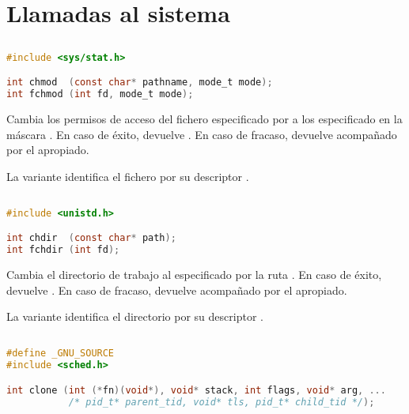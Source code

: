 \chapter{Llamadas al sistema}

\section{}\label{chmod}

\begin{lstlisting}[language=C]
#include <sys/stat.h>

int chmod  (const char* pathname, mode_t mode);
int fchmod (int fd, mode_t mode);
\end{lstlisting}

Cambia los permisos de acceso del fichero especificado por  a los especificado en la máscara .
En caso de éxito, devuelve .
En caso de fracaso, devuelve  acompañado por el  apropiado.

La variante  identifica el fichero por su descriptor .

\section{}\label{chdir}

\begin{lstlisting}[language=C]
#include <unistd.h>

int chdir  (const char* path);
int fchdir (int fd);
\end{lstlisting}

Cambia el directorio de trabajo al especificado por la ruta .
En caso de éxito, devuelve .
En caso de fracaso, devuelve  acompañado por el  apropiado.

La variante  identifica el directorio por su descriptor .

\section{}\label{clone}

\begin{lstlisting}[language=C]
#define _GNU_SOURCE
#include <sched.h>

int clone (int (*fn)(void*), void* stack, int flags, void* arg, ...
           /* pid_t* parent_tid, void* tls, pid_t* child_tid */);
\end{lstlisting}

